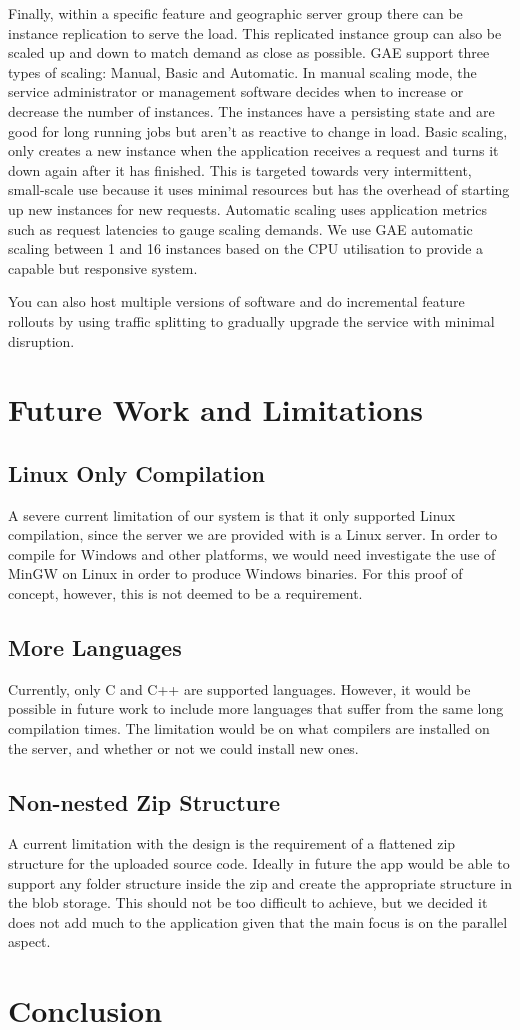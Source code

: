 \documentclass[conference]{IEEEtran}
\begin{document}
Finally, within a specific feature and geographic server group there can be instance replication to serve the load. This replicated instance group can also be scaled up and down to match demand as close as possible. GAE support three types of scaling: Manual, Basic and Automatic. In manual scaling mode, the service administrator or management software decides when to increase or decrease the number of instances. The instances have a persisting state and are good for long running jobs but aren't as reactive to change in load. Basic scaling, only creates a new instance when the application receives a request and turns it down again after it has finished. This is targeted towards very intermittent, small-scale use because it uses minimal resources but has the overhead of starting up new instances for new requests. Automatic scaling uses application metrics such as request latencies to gauge scaling demands. We use GAE automatic scaling between 1 and 16 instances based on the CPU utilisation to provide a capable but responsive system. 

You can also host multiple versions of software and do incremental feature rollouts by using traffic splitting to gradually upgrade the service with minimal disruption.


\section{Future Work and Limitations}
\subsection{Linux Only Compilation}
A severe current limitation of our system is that it only supported Linux
compilation, since the server we are provided with is a Linux server. In order
to compile for Windows and other platforms, we would need investigate the use of
MinGW on Linux in order to produce Windows binaries. For this proof of concept,
however, this is not deemed to be a requirement.
\subsection{More Languages}
Currently, only C and C++ are supported languages. However, it would be possible
in future work to include more languages that suffer from the same long
compilation times. The limitation would be on what compilers are installed on
the server, and whether or not we could install new ones.
\subsection{Non-nested Zip Structure}
A current limitation with the design is the requirement of a flattened zip
structure for the uploaded source code. Ideally in future the app would be able
to support any folder structure inside the zip and create the appropriate
structure in the blob storage. This should not be too difficult to achieve, but
we decided it does not add much to the application given that the main focus is
on the parallel aspect.
\section{Conclusion}

\end{document}
